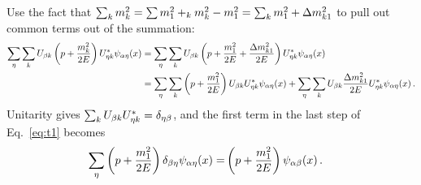 Use the fact that $\sum_k m_k^2 =  \sum m_1^2 +_k m^2_k - m^2_1 =\sum_k m_1^2 +  \dm_{k1}$ to pull out common terms out of the summation:
\begin{align}\label{eq:t1}
    \sum_\eta \sum_k U_{\b k} \left(p + \frac{m^2_k}{2E}\right) U^*_{\eta k} \psi_{\a\eta}(x) &= \sum_\eta \sum_k U_{\b k} \left(p + \frac{m^2_1}{2E} + \frac{\dm_{k1}}{2E}\right) U^*_{\eta k} \psi_{\a\eta}(x) \nonumber \\
    &= \sum_\eta\sum_k \left(p + \frac{m^2_1}{2E}\right) U_{\b k} U^*_{\eta k} \psi_{\a\eta}(x) + \sum_\eta\sum_k U_{\b k} \frac{\dm_{k1}}{2E} U^*_{\eta k} \psi_{\a\eta}(x)\,.
\end{align}
Unitarity gives $ \sum_k U_{\beta k} U^*_{\eta k} = \delta_{\eta\beta}$, and the first term in the last step of Eq.~\ref{eq:t1} becomes
\begin{align}
    \sum_\eta \left(p + \frac{m^2_1}{2E}\right) \delta_{\beta \eta} \psi_{\alpha\eta}(x)
    =& \left(p + \frac{m^2_1}{2E}\right) \psi_{\alpha\beta}(x)\,.
\end{align}

